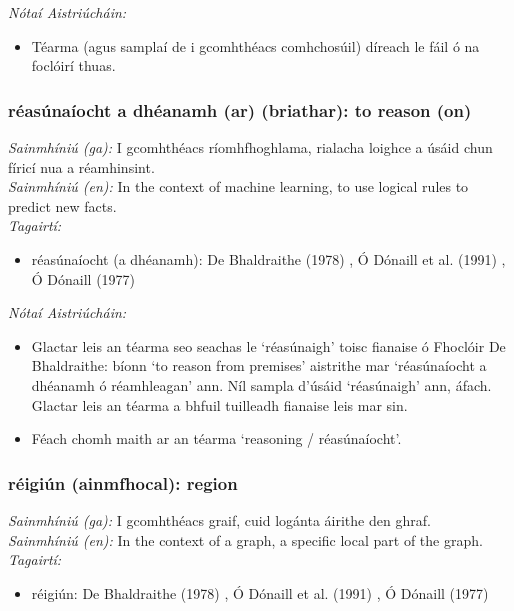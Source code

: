 \documentclass{article}
\begin{document}
 \noindent \textit{Nótaí Aistriúcháin:}
\begin{itemize}
	\item Téarma (agus samplaí de i gcomhthéacs comhchosúil) díreach le fáil ó na foclóirí thuas.
\end{itemize}


\subsubsection*{réasúnaíocht a dhéanamh (ar) (briathar): to reason (on)}
 \noindent \textit{Sainmhíniú (ga):} I gcomhthéacs ríomhfhoghlama, rialacha loighce a úsáid chun fíricí nua a réamhinsint.
\\
 \noindent \textit{Sainmhíniú (en):} In the context of machine learning, to use logical rules to predict new facts.
\\
 \noindent \textit{Tagairtí:}
\begin{itemize}
	\item réasúnaíocht (a dhéanamh): De Bhaldraithe (1978) \cite{de-bhaldraithe}, Ó Dónaill et al. (1991) \cite{focloir-beag}, Ó Dónaill (1977) \cite{odonaill}
\end{itemize}

 \noindent \textit{Nótaí Aistriúcháin:}
\begin{itemize}
	\item Glactar leis an téarma seo seachas le `réasúnaigh' toisc fianaise ó Fhoclóir De Bhaldraithe: bíonn `to reason from premises' aistrithe mar `réasúnaíocht a dhéanamh ó réamhleagan' ann. Níl sampla d'úsáid `réasúnaigh' ann, áfach. Glactar leis an téarma a bhfuil tuilleadh fianaise leis mar sin.
	\item Féach chomh maith ar an téarma `reasoning / réasúnaíocht'.
\end{itemize}


\subsubsection*{réigiún (ainmfhocal): region}
 \noindent \textit{Sainmhíniú (ga):} I gcomhthéacs graif, cuid logánta áirithe den ghraf.
\\
 \noindent \textit{Sainmhíniú (en):} In the context of a graph, a specific local part of the graph.
\\
 \noindent \textit{Tagairtí:}
\begin{itemize}
	\item réigiún: De Bhaldraithe (1978) \cite{de-bhaldraithe}, Ó Dónaill et al. (1991) \cite{focloir-beag}, Ó Dónaill (1977) \cite{odonaill}
\end{itemize}
\end{document}
